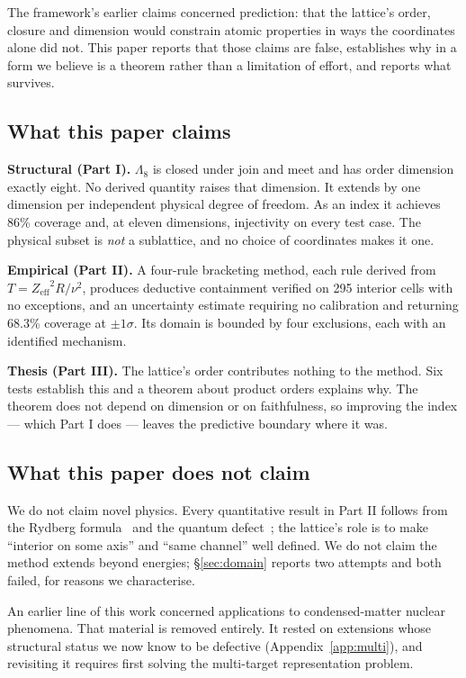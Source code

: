 \documentclass[11pt,a4paper]{article}
\theoremstyle{definition}
\newcommand{\Le}{\ensuremath{\Lambda_{8}}}
\newcommand{\Zeff}{\ensuremath{Z_{\mathrm{eff}}}}
\begin{document}
The framework's earlier claims concerned prediction: that the lattice's order,
closure and dimension would constrain atomic properties in ways the coordinates
alone did not. This paper reports that those claims are false, establishes why
in a form we believe is a theorem rather than a limitation of effort, and
reports what survives.

\subsection{What this paper claims}
\textbf{Structural (Part I).} \Le{} is closed under join and meet and has order
dimension exactly eight. No derived quantity raises that dimension. It extends
by one dimension per independent physical degree of freedom. As an index it
achieves 86\% coverage and, at eleven dimensions, injectivity on every test
case. The physical subset is \emph{not} a sublattice, and no choice of
coordinates makes it one.

\textbf{Empirical (Part II).} A four-rule bracketing method, each rule derived
from $T=\Zeff^{2}R/\nu^{2}$, produces deductive containment verified on 295
interior cells with no exceptions, and an uncertainty estimate requiring no
calibration and returning 68.3\% coverage at $\pm1\sigma$. Its domain is bounded
by four exclusions, each with an identified mechanism.

\textbf{Thesis (Part III).} The lattice's order contributes nothing to the
method. Six tests establish this and a theorem about product orders explains
why. The theorem does not depend on dimension or on faithfulness, so improving
the index --- which Part I does --- leaves the predictive boundary where it was.

\subsection{What this paper does not claim}
We do not claim novel physics. Every quantitative result in Part II follows from
the Rydberg formula~\cite{rydberg} and the quantum defect~\cite{ritz,seaton};
the lattice's role is to make ``interior on some axis'' and ``same channel''
well defined. We do not claim the method extends beyond energies;
\S\ref{sec:domain} reports two attempts and both failed, for reasons we
characterise.

An earlier line of this work concerned applications to condensed-matter nuclear
phenomena. That material is removed entirely. It rested on extensions whose
structural status we now know to be defective (Appendix~\ref{app:multi}), and
revisiting it requires first solving the multi-target representation problem.
\end{document}

